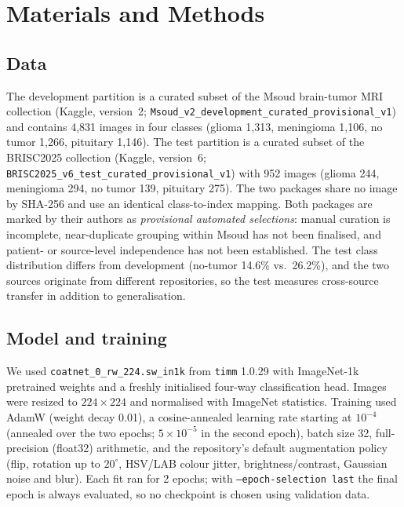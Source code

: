 \documentclass[10pt,a4paper]{article}
\begin{document}
\section{Materials and Methods}
\subsection{Data}
The development partition is a curated subset of the Msoud brain-tumor MRI collection (Kaggle, version~2; \texttt{Msoud\_v2\_development\_curated\_provisional\_v1}) and contains 4,831 images in four classes (glioma 1,313, meningioma 1,106, no tumor 1,266, pituitary 1,146). The test partition is a curated subset of the BRISC2025 collection (Kaggle, version~6; \texttt{BRISC2025\_v6\_test\_curated\_provisional\_v1}) with 952 images (glioma 244, meningioma 294, no tumor 139, pituitary 275). The two packages share no image by SHA-256 and use an identical class-to-index mapping. Both packages are marked by their authors as \emph{provisional automated selections}: manual curation is incomplete, near-duplicate grouping within Msoud has not been finalised, and patient- or source-level independence has not been established. The test class distribution differs from development (no-tumor 14.6\% vs.\ 26.2\%), and the two sources originate from different repositories, so the test measures cross-source transfer in addition to generalisation.

\subsection{Model and training}
We used \texttt{coatnet\_0\_rw\_224.sw\_in1k} from \texttt{timm} 1.0.29 with ImageNet-1k pretrained weights and a freshly initialised four-way classification head. Images were resized to $224\times224$ and normalised with ImageNet statistics. Training used AdamW (weight decay 0.01), a cosine-annealed learning rate starting at $10^{-4}$ (annealed over the two epochs; $5\times10^{-5}$ in the second epoch), batch size 32, full-precision (float32) arithmetic, and the repository's default augmentation policy (flip, rotation up to $20^{\circ}$, HSV/LAB colour jitter, brightness/contrast, Gaussian noise and blur). Each fit ran for 2 epochs; with \texttt{--epoch-selection last} the final epoch is always evaluated, so no checkpoint is chosen using validation data.
\end{document}

